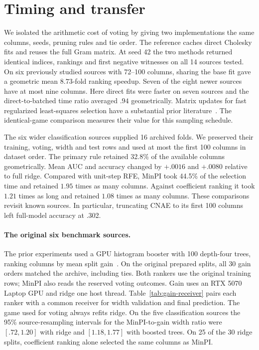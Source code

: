 \section{Timing and transfer}
We isolated the arithmetic cost of voting by giving two implementations the
same columns, seeds, pruning rules and tie order. The reference caches direct
Cholesky fits and reuses the full Gram matrix. At seed 42 the two methods
returned identical indices, rankings and first negative witnesses on all 14
sources tested. On six previously studied sources with 72--100 columns,
sharing the base fit gave a geometric mean $8.73$-fold ranking speedup.
Seven of the eight newer sources have at most nine columns. Here direct fits
were faster on seven sources and the direct-to-batched time ratio averaged
$.94$ geometrically. Matrix updates for fast regularized least-squares
selection have a substantial prior literature~\cite{pahikkala2010rls,pahikkala2016rlscore}.
The identical-game comparison measures their value for this sampling schedule.

The six wider classification sources supplied 16 archived folds. We preserved
their training, voting, width and test rows and used at most the first 100 columns
in dataset order. The primary rule retained 32.8\% of the available columns
geometrically. Mean AUC and accuracy changed by $+.0016$ and $+.0080$ relative
to full ridge. Compared with unit-step RFE, MinPI took 44.5\% of the selection
time and retained $1.95$ times as many columns. Against coefficient ranking it
took $1.21$ times as long and retained $1.08$ times as many columns. These
comparisons revisit known sources. In particular, truncating CNAE to its first
100 columns left full-model accuracy at .302.

\paragraph{The original six benchmark sources.}
The prior experiments used a GPU histogram booster with 100 depth-four trees,
ranking columns by mean split gain~\cite{chen2016xgboost}. On the original
prepared splits, all 30 gain orders matched the archive, including ties.
Both rankers use the original training rows; MinPI also reads the reserved
voting outcomes. Gain uses an RTX 5070 Laptop GPU and ridge one host thread.
Table~\ref{tab:gain-receiver} pairs each ranker with a common receiver for
width validation and final prediction. The game used for voting always refits
ridge. On the five classification sources the 95\% source-resampling intervals
for the MinPI-to-gain width ratio were $[.72,1.20]$ with ridge and
$[1.18,1.77]$ with boosted trees. On 25 of the 30 ridge splits, coefficient
ranking alone selected the same columns as MinPI.

